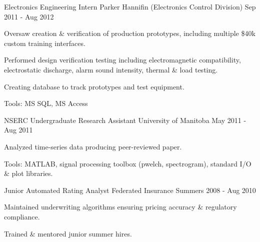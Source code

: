 \begin{cventries}
  \cventry
	{Electronics Engineering Intern} %
	{Parker Hannifin (Electronics Control Division)} %
	{\winnipeg} %
	{Sep 2011 - Aug 2012} %
	{
		\begin{cvitems} %
			\item {Oversaw creation \& verification of production prototypes, including multiple \$40k custom training interfaces.}
			\item {Performed design verification testing including electromagnetic compatibility, electrostatic discharge, alarm sound intensity, thermal \& load testing.}
			\item {Creating database to track prototypes and test equipment.}
			\item {Tools: MS SQL, MS Access}
		\end{cvitems}
	}

  \cventry
	{NSERC Undergraduate Research Assistant} %
	{University of Manitoba} %
	{\winnipeg} %
	{May 2011 - Aug 2011} %
	{
		\begin{cvitems} %
			\item {Analyzed time-series data producing peer-reviewed paper.}
			\item {Tools: MATLAB, signal processing toolbox (pwelch, spectrogram), standard I/O \& plot libraries.}
		\end{cvitems}
	}

  \cventry
	{Junior Automated Rating Analyst} %
	{Federated Insurance} %
	{\winnipeg} %
	{Summers 2008 - Aug 2010} %
	{
		\begin{cvitems} %
			\item {Maintained underwriting algorithms ensuring pricing accuracy \& regulatory compliance. }
			\item {Trained \& mentored junior summer hires.}
		\end{cvitems}
	}

\end{cventries}
